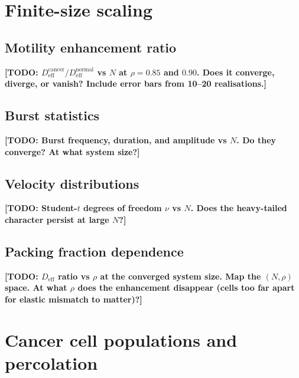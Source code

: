 \documentclass[aps,pre,twocolumn,superscriptaddress,longbibliography,floatfix]{revtex4-2}
\newcommand{\Deff}{D_{\mathrm{eff}}}       %
\newcommand{\TODO}[1]{{\color{red}\textbf{[TODO: #1]}}}
\begin{document}
\section{Finite-size scaling}
\label{sec:fss}

\subsection{Motility enhancement ratio}
\label{sec:fss:ratio}

\TODO{$\Deff^{\mathrm{cancer}} / \Deff^{\mathrm{normal}}$ vs $N$ at
$\rho = 0.85$ and $0.90$.  Does it converge, diverge, or vanish?
Include error bars from 10--20 realisations.}

\subsection{Burst statistics}
\label{sec:fss:bursts}

\TODO{Burst frequency, duration, and amplitude vs $N$.  Do they
converge?  At what system size?}

\subsection{Velocity distributions}
\label{sec:fss:velocity}

\TODO{Student-$t$ degrees of freedom $\nu$ vs $N$.  Does the
heavy-tailed character persist at large $N$?}

\subsection{Packing fraction dependence}
\label{sec:fss:rho}

\TODO{$\Deff$ ratio vs $\rho$ at the converged system size.
Map the $(N, \rho)$ space.  At what $\rho$ does the enhancement
disappear (cells too far apart for elastic mismatch to matter)?}


\section{Cancer cell populations and percolation}
\label{sec:percolation}
\end{document}

